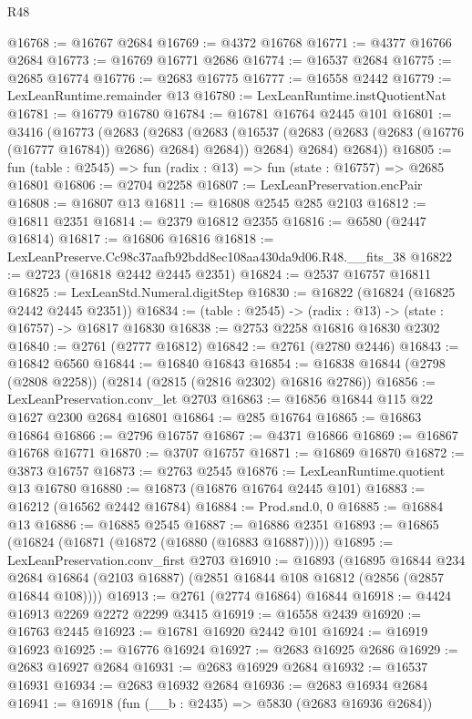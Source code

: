 \begin{lexlean}{R48}
\begin{coremodule}
@16768 := @16767 @2684
@16769 := @4372 @16768
@16771 := @4377 @16766 @2684
@16773 := @16769 @16771 @2686
@16774 := @16537 @2684
@16775 := @2685 @16774
@16776 := @2683 @16775
@16777 := @16558 @2442
@16779 := LexLeanRuntime.remainder @13
@16780 := LexLeanRuntime.instQuotientNat
@16781 := @16779 @16780
@16784 := @16781 @16764 @2445 @101
@16801 := @3416
    (@16773
      (@2683
        (@2683
          (@2683 (@16537 (@2683 (@2683 (@2683 (@16776 (@16777 @16784)) @2686) @2684) @2684)) @2684)
          @2684)
        @2684))
@16805 := fun (table : @2545) => fun (radix : @13) => fun (state : @16757) => @2685 @16801
@16806 := @2704 @2258
@16807 := LexLeanPreservation.encPair
@16808 := @16807 @13
@16811 := @16808 @2545 @285 @2103
@16812 := @16811 @2351
@16814 := @2379 @16812 @2355
@16816 := @6580 (@2447 @16814)
@16817 := @16806 @16816
@16818 := LexLeanPreserve.Cc98c37aafb92bdd8ec108aa430da9d06.R48.__fits_38
@16822 := @2723 (@16818 @2442 @2445 @2351)
@16824 := @2537 @16757 @16811
@16825 := LexLeanStd.Numeral.digitStep
@16830 := @16822 (@16824 (@16825 @2442 @2445 @2351))
@16834 := (table : @2545) -> (radix : @13) -> (state : @16757) -> @16817 @16830
@16838 := @2753 @2258 @16816 @16830 @2302
@16840 := @2761 (@2777 @16812)
@16842 := @2761 (@2780 @2446)
@16843 := @16842 @6560
@16844 := @16840 @16843
@16854 := @16838 @16844 (@2798 (@2808 @2258)) (@2814 (@2815 (@2816 @2302) @16816 @2786))
@16856 := LexLeanPreservation.conv_let @2703
@16863 := @16856 @16844 @115 @22 @1627 @2300 @2684 @16801
@16864 := @285 @16764
@16865 := @16863 @16864
@16866 := @2796 @16757
@16867 := @4371 @16866
@16869 := @16867 @16768 @16771
@16870 := @3707 @16757
@16871 := @16869 @16870
@16872 := @3873 @16757
@16873 := @2763 @2545
@16876 := LexLeanRuntime.quotient @13 @16780
@16880 := @16873 (@16876 @16764 @2445 @101)
@16883 := @16212 (@16562 @2442 @16784)
@16884 := Prod.snd.{0, 0}
@16885 := @16884 @13
@16886 := @16885 @2545
@16887 := @16886 @2351
@16893 := @16865 (@16824 (@16871 (@16872 (@16880 (@16883 @16887)))))
@16895 := LexLeanPreservation.conv_first @2703
@16910 := @16893
    (@16895
      @16844
      @234
      @2684
      @16864
      (@2103 @16887)
      (@2851 @16844 @108 @16812 (@2856 (@2857 @16844 @108))))
@16913 := @2761 (@2774 @16864) @16844
@16918 := @4424 @16913 @2269 @2272 @2299 @3415
@16919 := @16558 @2439
@16920 := @16763 @2445
@16923 := @16781 @16920 @2442 @101
@16924 := @16919 @16923
@16925 := @16776 @16924
@16927 := @2683 @16925 @2686
@16929 := @2683 @16927 @2684
@16931 := @2683 @16929 @2684
@16932 := @16537 @16931
@16934 := @2683 @16932 @2684
@16936 := @2683 @16934 @2684
@16941 := @16918 (fun (__b : @2435) => @5830 (@2683 @16936 @2684))

\end{coremodule}
\end{lexlean}
